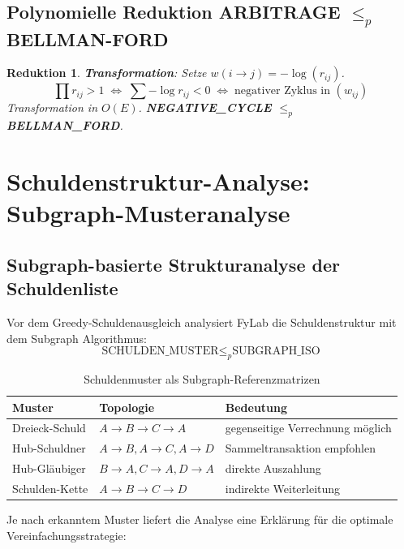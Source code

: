 \documentclass[a4paper,12pt]{article}
\newtheorem{reduktion}{Reduktion}
\begin{document}
\subsection{Polynomielle Reduktion ARBITRAGE $\leq_p$ BELLMAN-FORD}

\begin{reduktion}
    \textbf{Transformation}: Setze $w(i \to j) = -\log(r_{ij})$.
    \[
        \prod r_{ij} > 1 \;\Longleftrightarrow\; \sum{-\log r_{ij}} < 0
        \;\Longleftrightarrow\; \text{negativer Zyklus in } (w_{ij})
    \]
    Transformation in $O(E)$. \textbf{NEGATIVE\_CYCLE $\leq_p$ BELLMAN\_FORD}.
\end{reduktion}

\section{Schuldenstruktur-Analyse: Subgraph-Musteranalyse}
\label{sec:maxflow}

\subsection{Subgraph-basierte Strukturanalyse der Schuldenliste}

Vor dem Greedy-Schuldenausgleich analysiert FyLab die Schuldenstruktur
mit dem Subgraph Algorithmus:
\[
    \text{SCHULDEN\_MUSTER} \leq_p \text{SUBGRAPH\_ISO}
\]

\begin{table}[h]
    \centering
    \begin{tabular}{@{}lll@{}}
        \toprule
        \textbf{Muster} & \textbf{Topologie} & \textbf{Bedeutung} \\
        \midrule
        Dreieck-Schuld & $A{\to}B{\to}C{\to}A$ & gegenseitige Verrechnung möglich \\
        Hub-Schuldner  & $A{\to}B, A{\to}C, A{\to}D$ & Sammeltransaktion empfohlen \\
        Hub-Gläubiger  & $B{\to}A, C{\to}A, D{\to}A$ & direkte Auszahlung \\
        Schulden-Kette & $A{\to}B{\to}C{\to}D$ & indirekte Weiterleitung \\
        \bottomrule
    \end{tabular}
    \caption{Schuldenmuster als Subgraph-Referenzmatrizen}
\end{table}

Je nach erkanntem Muster liefert die Analyse eine Erklärung für die
optimale Vereinfachungsstrategie:
\end{document}
